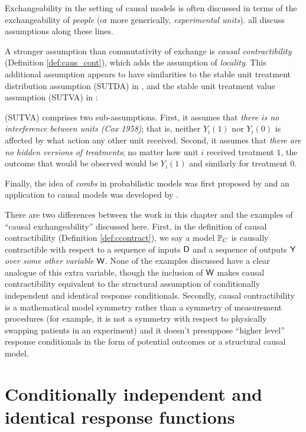 Exchangeability in the setting of causal models is often discussed in terms of the exchangeability of \emph{people} (or more generically, \emph{experimental units}). \citet{hernan_beyond_2012,greenland_identifiability_1986,banerjee_chapter_2017,dawid_decision-theoretic_2020} all discuss assumptions along these lines.

A stronger assumption than commutativity of exchange is \emph{causal contractibility} (Definition \ref{def:caus_cont}), which adds the assumption of \emph{locality}. This additional assumption appears to have similarities to the stable unit treatment distribution assumption (SUTDA) in \citet{dawid_decision-theoretic_2020}, and the stable unit treatment value assumption (SUTVA) in \citep{rubin_causal_2005}:
\begin{blockquote}
(SUTVA) comprises two sub-assumptions. First, it assumes that \emph{there is no interference between units (Cox 1958)}; that is, neither $Y_i(1)$ nor $Y_i(0)$ is affected by what action any other unit received. Second, it assumes that \emph{there are no hidden versions of treatments}; no matter how unit $i$ received treatment $1$, the outcome that would be observed would be $Y_i(1)$ and similarly for treatment $0$.
\end{blockquote}

Finally, the idea of \emph{combs} in probabilistic models was first proposed by \citet{chiribella_quantum_2008} and an application to causal models was developed by \citet{jacobs_causal_2019}.

There are two differences between the work in this chapter and the examples of ``causal exchangeability'' discussed here. First, in the definition of causal contractibility (Definition \ref{def:ccontract}), we say a model $\mathbb{P}_C$ is causally contractible with respect to a sequence of inputs $\mathsf{D}$ and a sequence of outputs $\mathsf{Y}$ \emph{over some other variable} $\mathsf{W}$. None of the examples discussed have a clear analogue of this extra variable, though the inclusion of $\mathsf{W}$ makes causal contractibility equivalent to the structural assumption of conditionally independent and identical response conditionals. Secondly, causal contractibility is a mathematical model symmetry rather than a symmetry of measurement procedures (for example, it is not a symmetry with respect to physically swapping patients in an experiment) and it doesn't presuppose ``higher level'' response conditionals in the form of potential outcomes or a structural causal model.

\section[Response functions]{Conditionally independent and identical response functions}\label{sec:response_functions}

